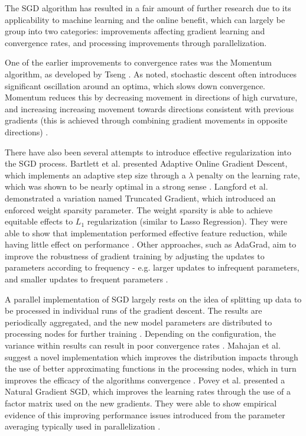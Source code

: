 \documentclass[a4paper,11pt,oneside]{article}
\theoremstyle{plain}
\theoremstyle{definition}
\begin{document}
 The SGD algorithm has resulted in a fair amount of further research due to its applicability to machine learning 
 and the online benefit, which can largely be group into two categories: improvements affecting gradient learning 
 and convergence rates, and processing improvements through parallelization.
\hfill\break
 
 One of the earlier improvements to convergence rates was the Momentum algorithm, as developed by Tseng \cite{Tseng}. 
 As noted, stochastic descent often introduces significant oscillation around an optima, which slows down 
 convergence. Momentum reduces this by decreasing movement in directions of high curvature, and increasing 
 increasing movement towards directions consistent with previous gradients (this is achieved through combining 
 gradient movements in opposite directions) .
\hfill\break

There have also been several attempts to introduce effective regularization into the SGD process. Bartlett et al. 
presented Adaptive Online Gradient Descent, which implements an adaptive step size through a $\lambda$ 
penalty on the learning rate, which was shown to be nearly optimal in a strong sense \cite{Bartlett}. Langford et al. 
demonstrated a variation named Truncated Gradient, which introduced an enforced weight sparsity parameter. 
The weight sparsity is able to achieve equitable effects to $L_1$ regularization (similar to Lasso Regression). 
They were able to show that implementation performed effective feature reduction, while having little effect on 
performance \cite{Langford}. Other approaches, such as AdaGrad, aim to improve the robustness of gradient training by 
adjusting the updates to parameters according to frequency - e.g. larger updates to infrequent parameters, and 
smaller updates to frequent parameters \cite{Duchi, Zeiler}. 
\hfill\break

A parallel implementation of SGD largely rests on the idea of splitting up data to be processed in individual runs 
of the gradient descent. The results are periodically aggregated, and the new model parameters are distributed 
to processing nodes for further training \cite{Zinkevich}. Depending on the configuration, the variance within results can 
result in poor convergence rates \cite{Mahajan}. Mahajan et al. suggest a novel implementation which improves the 
distribution impacts through the use of better approximating functions in the processing nodes, which in turn 
improves the efficacy of the algorithms convergence \cite{Mahajan}. Povey et al. presented a Natural Gradient SGD, 
which improves the learning rates through the use of a factor matrix used on the new gradients. They were able 
to show empirical evidence of this improving performance issues introduced from the parameter averaging 
typically used in parallelization \cite{Povey}.
\hfill\break
\end{document}
